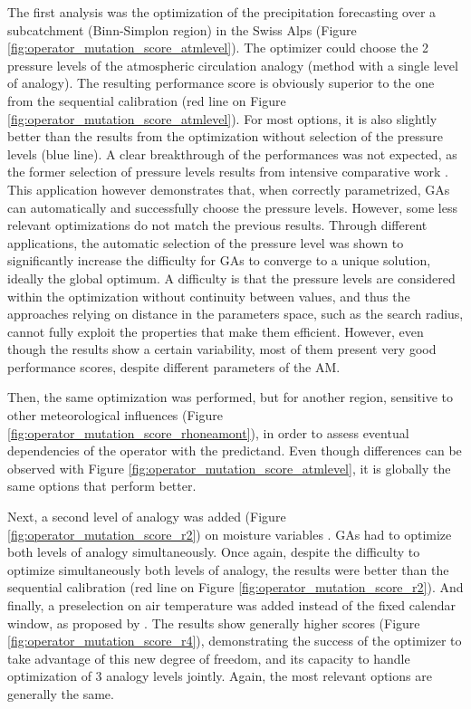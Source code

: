 \documentclass[twocol]{ametsoc}
\begin{document}
The first analysis was the optimization of the precipitation forecasting over a subcatchment (Binn-Simplon region) in the Swiss Alps (Figure \ref{fig:operator_mutation_score_atmlevel}). The optimizer could choose the 2 pressure levels of the atmospheric circulation analogy (method with a single level of analogy). The resulting performance score \citep[CRPSS = skill score of the CRPS, see][]{Brown1974} is obviously superior to the one from the sequential calibration (red line on Figure \ref{fig:operator_mutation_score_atmlevel}). For most options, it is also slightly better than the results from the optimization without selection of the pressure levels (blue line). A clear breakthrough of the performances was not expected, as the former selection of pressure levels results from intensive comparative work \citep{Bontron2004}. This application however demonstrates that, when correctly parametrized, GAs can automatically and successfully choose the pressure levels. However, some less relevant optimizations do not match the previous results. Through different applications, the automatic selection of the pressure level was shown to significantly increase the difficulty for GAs to converge to a unique solution, ideally the global optimum. A difficulty is that the pressure levels are considered within the optimization without continuity between values, and thus the approaches relying on distance in the parameters space, such as the search radius, cannot fully exploit the properties that make them efficient. However, even though the results show a certain variability, most of them present very good performance scores, despite different parameters of the AM.

Then, the same optimization was performed, but for another region, sensitive to other meteorological influences (Figure \ref{fig:operator_mutation_score_rhoneamont}), in order to assess eventual dependencies of the operator with the predictand. Even though differences can be observed with Figure \ref{fig:operator_mutation_score_atmlevel}, it is globally the same options that perform better.

Next, a second level of analogy was added (Figure \ref{fig:operator_mutation_score_r2}) on moisture variables \citep[see][]{Bontron2004, Horton2016}. GAs had to optimize both levels of analogy simultaneously. Once again, despite the difficulty to optimize simultaneously both levels of analogy, the results were better than the sequential calibration (red line on Figure \ref{fig:operator_mutation_score_r2}). And finally, a preselection on air temperature was added instead of the fixed calendar window, as proposed by \cite{BenDaoud2015}. The results show generally higher scores (Figure \ref{fig:operator_mutation_score_r4}), demonstrating the success of the optimizer to take advantage of this new degree of freedom, and its capacity to handle optimization of 3 analogy levels jointly. Again, the most relevant options are generally the same.
\end{document}
